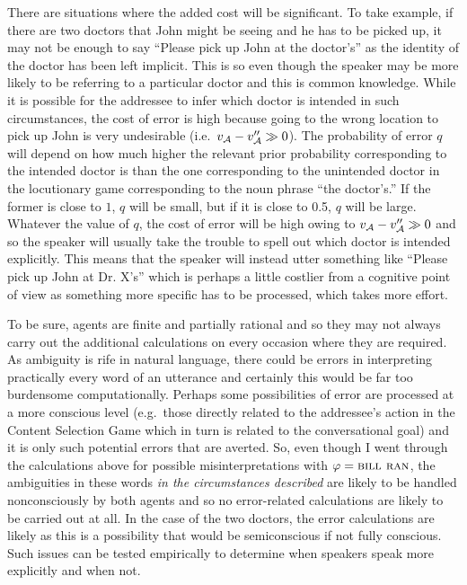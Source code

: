 There are situations where the added cost will be significant. To take  example, if there are two doctors that John might be seeing and he has to be picked up, it may not be enough to say ``Please pick up John at the doctor's'' as the identity of the doctor has been left implicit. This is so even though the speaker may be more likely to be referring to a particular doctor and this is common knowledge. While it is possible for the addressee to infer which doctor is intended in such circumstances, the cost of error is high because going to the wrong location to pick up John is very undesirable (i.e.\ $v_{\cal A} - v''_{\cal A} \gg 0$). The probability of error $q$ will depend on how much higher the relevant prior probability corresponding to the intended doctor is than the one corresponding to the unintended doctor in the locutionary game corresponding to the noun phrase ``the doctor's.'' If the former is close to $1$, $q$ will be small, but if it is close to 0.5, $q$ will be large. Whatever the value of $q$, the cost of error will be high owing to $v_{\cal A} - v''_{\cal A} \gg 0$ and so the speaker will usually take the trouble to spell out which doctor is intended explicitly. This means that the speaker will instead utter something like ``Please pick up John at Dr. X's'' which is perhaps a little costlier from a cognitive point of view as something more specific has to be processed, which takes more effort.

To be sure, agents are finite and partially rational and so they may not always carry out the additional calculations on every occasion where they are required. As ambiguity is rife in natural language, there could be errors in interpreting practically every word of an utterance and certainly this would be far too burdensome computationally. Perhaps some possibilities of error are processed at a more conscious level (e.g.\ those directly related to the addressee's action in the Content Selection Game which in turn is related to the conversational goal) and it is only such potential errors that are averted. So, even though I went through the calculations above for possible misinterpretations with $\varphi = \Expression{bill ran}$, the ambiguities in these words \emph{in the circumstances described} are likely to be handled nonconsciously by both agents and so no error-related calculations are likely to be carried out at all. In the case of the two doctors, the error calculations are likely as this is a possibility that would be semiconscious if not fully conscious. Such issues can be tested empirically to determine when speakers speak more explicitly and when not.\largerpage


